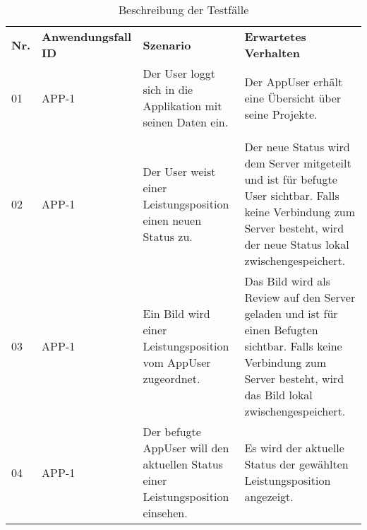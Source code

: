 \centering
\begin{longtable}[c]{|p{1cm}|p{3cm}|p{4cm}|p{6cm}|}
    \caption{Beschreibung der Testfälle}
    \label{fig:testfälle}
    \endlastfoot
    \hline \multicolumn{4}{|r|}{{Weitergeführt auf der folgenden Seite}}                                                                                                                                                                                                                                                                        \\ \hline
    \endfoot
    \hline
    \textbf{Nr.} & \textbf{Anwendungsfall ID} & \textbf{Szenario}                                                                                                  & \textbf{Erwartetes Verhalten}                                                                                                                                              \\ \hline
    \endhead
    \hline
    01           & APP-1                      & Der User loggt sich in die Applikation mit seinen Daten ein.                                                       & Der AppUser erhält eine Übersicht über seine Projekte.   \\ \hline                                                                                                                                                                                                                                                                                                               \\ \hline
    02           & APP-1                      & Der User weist einer Leistungsposition einen neuen Status zu.                                                     & Der neue Status wird dem Server mitgeteilt und ist für befugte User sichtbar. Falls keine Verbindung zum Server besteht, wird der neue Status lokal zwischengespeichert. \\ \hline
    03           & APP-1                      & Ein Bild wird einer Leistungsposition vom AppUser zugeordnet.                                                       & Das Bild wird als Review auf den Server geladen und ist für einen Befugten sichtbar. Falls keine Verbindung zum Server besteht, wird das Bild lokal zwischengespeichert.   \\ \hline
    04           & APP-1                      & Der befugte AppUser will den aktuellen Status einer Leistungsposition einsehen.                                     & Es wird der aktuelle Status der gewählten Leistungsposition angezeigt.                                                                                                     \\ \hline

\end{longtable}

